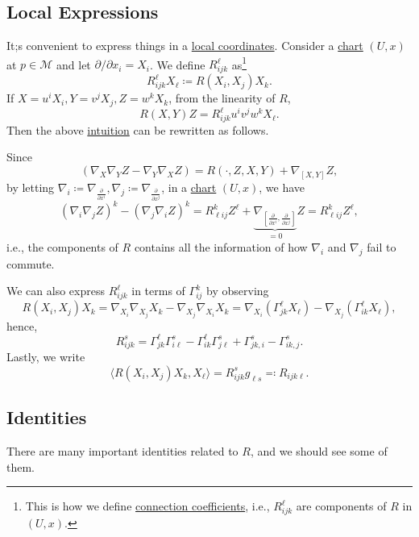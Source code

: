 \subsection{Local Expressions}
It;s convenient to express things in a \hyperref[def:local-coordinate]{local coordinates}. Consider a \hyperref[def:local-coordinate]{chart} \((U, x)\) at \(p\in \mathcal{M} \) and let \(\partial /\partial x_i = X_i\). We define \(R_{ijk}^{\ell }\) as\footnote{This is how we define \hyperref[not:connection-coefficient]{connection coefficients}, i.e., \(R^{\ell }_{ijk} \) are components of \(R\) in \((U, x)\).}
\[
	R^{\ell }_{ijk} X_{\ell } \coloneqq R(X_i, X_j) X_k.
\]
If \(X = u^i X_i, Y = v^j X_j, Z = w^k X_k\), from the linearity of \(R\),
\[
	R(X, Y)Z = R^{\ell }_{ijk} u^i v^j w^k X_{\ell }.
\]
Then the above \hyperref[int:lec10]{intuition} can be rewritten as follows.

\begin{remark}
	Since
	\[
		\left( \nabla _X \nabla _Y Z - \nabla _Y \nabla _X Z \right) = R(\cdot, Z, X, Y) + \nabla _{[X, Y]} Z,
	\]
	by letting \(\nabla _i \coloneqq \nabla _{\frac{\partial }{\partial x^i} }, \nabla _j \coloneqq \nabla _{\frac{\partial }{\partial x^j} }\), in a \hyperref[def:coordinate-chart]{chart} \((U, x)\), we have
	\[
		(\nabla _i \nabla _j Z)^k - (\nabla _j \nabla _i Z)^k
		= R^k_{\ell ij} Z^{\ell } + \underbrace{\nabla _{\left[ \frac{\partial }{\partial x^i} , \frac{\partial }{\partial x^j} \right] }}_{=0} Z
		= R^k_{\ell ij} Z^{\ell },
	\]
	i.e., the components of \(R\) contains all the information of how \(\nabla _i\) and \(\nabla _j\) fail to commute.
\end{remark}

We can also express \(R^{\ell }_{ijk} \) in terms of \(\Gamma ^k_{ij}\) by observing
\[
	R(X_i, X_j)X_k
	= \nabla _{X_i} \nabla _{X_j} X_k - \nabla _{X_j} \nabla _{X_i} X_k
	= \nabla _{X_i} (\Gamma ^\ell _{jk} X_{\ell } ) - \nabla _{X_j} (\Gamma ^\ell _{ik} X_{\ell } ),
\]
hence,
\[
	R^s_{ijk} = \Gamma _{jk}^{\ell }  \Gamma ^s _{i \ell } - \Gamma ^\ell _{ik} \Gamma ^s _{j \ell } + \Gamma ^s _{jk, i} - \Gamma ^s _{ik, j}.
\]
Lastly, we write
\[
	\langle R(X_i, X_j) X_k, X_{\ell } \rangle = R^{s}_{ijk} g_{\ell s} \eqqcolon R_{i j k \ell }.
\]

\subsection{Identities}
There are many important identities related to \(R\), and we should see some of them.

